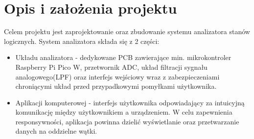 \section{Opis i założenia projektu}
    Celem projektu jest zaprojektowanie oraz zbudowanie systemu analizatora stanów logicznych.
    System analizatora składa się z 2 części:
    \begin{itemize}
        \item Układu analizatora - dedykowane PCB zawierające min. mikrokontroler
        Raspberry Pi Pico W, przetwornik ADC, układ filtracji sygnału analogowego(LPF)
        oraz interfejs wejściowy wraz z zabezpieczeniami chroniącymi układ przed przypadkowymi
        pomyłkami użytkownika.
        \item Aplikacji komputerowej - interfejs użytkownika odpowiadający za intuicyjną
        komunikację między użytkownikiem a urządzeniem. 
        W celu zapewnienia responsywności, aplikacja powinna dzielić wyświetlanie oraz przetwarzanie danych na oddzielne wątki.
    \end{itemize}

